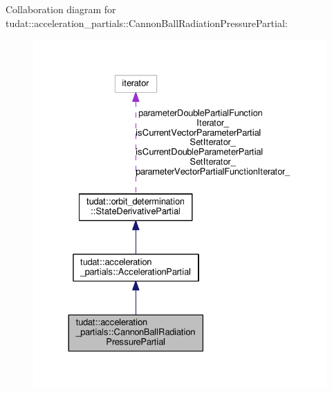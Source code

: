 Collaboration diagram for tudat\+:\+:acceleration\+\_\+partials\+:\+:Cannon\+Ball\+Radiation\+Pressure\+Partial\+:
\nopagebreak
\begin{figure}[H]
\begin{center}
\leavevmode
\includegraphics[width=330pt]{classtudat_1_1acceleration__partials_1_1CannonBallRadiationPressurePartial__coll__graph}
\end{center}
\end{figure}
